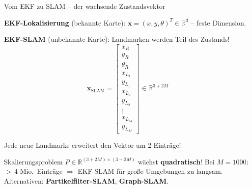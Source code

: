 \documentclass[%
  aspectratio=169,
  10pt
]{beamer}
\newcommand{\warn}[1]{{\color{blackberry}\textbf{#1}}}
\newcommand{\R}{\mathbb{R}}
\begin{document}
\begin{frame}{Vom EKF zu SLAM -- der wachsende Zustandsvektor}

\textbf{EKF-Lokalisierung} (bekannte Karte):
$\mathbf{x} = (x, y, \theta)^T \in \R^3$
\quad -- feste Dimension.

\pause
\vspace{2mm}
\textbf{EKF-SLAM} (unbekannte Karte): Landmarken werden Teil des Zustands!
\[
  \mathbf{x}_\mathrm{SLAM} =
  \begin{bmatrix}
    x_R \\ y_R \\ \theta_R \\
    \hline
    x_{L_1} \\ y_{L_1} \\
    \hline
    x_{L_2} \\ y_{L_2} \\
    \hline
    \vdots \\
    x_{L_M} \\ y_{L_M}
  \end{bmatrix}
  \in \R^{3 + 2M}
\]

Jede neue Landmarke erweitert den Vektor um 2 Einträge!

\pause
\vspace{1mm}
\begin{alertblock}{Skalierungsproblem}
  \vspace{-2mm}
  $P \in \R^{(3+2M) \times (3+2M)}$ wächst \warn{quadratisch}!
  Bei $M{=}1000$: ${>}\,4$ Mio.\ Einträge
  $\Rightarrow$ EKF-SLAM für große Umgebungen zu langsam.
  Alternativen: \textbf{Partikelfilter-SLAM}, \textbf{Graph-SLAM}.\vspace{-2mm}
\end{alertblock}

\end{frame}
\end{document}
